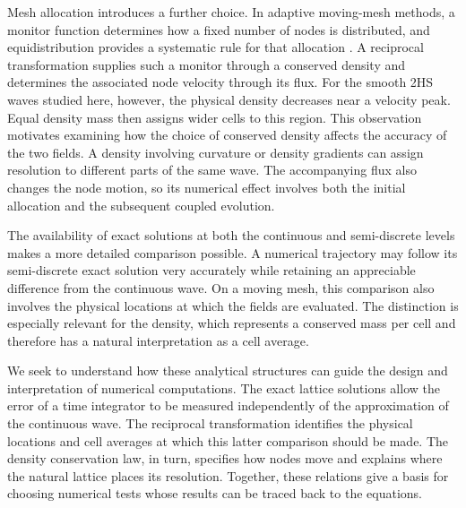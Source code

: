 \documentclass[11pt,a4paper]{article}
\begin{document}
Mesh allocation introduces a further choice. In adaptive moving-mesh methods, a monitor function determines how a fixed number of nodes is distributed, and equidistribution provides a systematic rule for that allocation \cite{huang2011}. A reciprocal transformation supplies such a monitor through a conserved density and determines the associated node velocity through its flux. For the smooth 2HS waves studied here, however, the physical density decreases near a velocity peak. Equal density mass then assigns wider cells to this region. This observation motivates examining how the choice of conserved density affects the accuracy of the two fields. A density involving curvature or density gradients can assign resolution to different parts of the same wave. The accompanying flux also changes the node motion, so its numerical effect involves both the initial allocation and the subsequent coupled evolution.

The availability of exact solutions at both the continuous and semi-discrete levels makes a more detailed comparison possible. A numerical trajectory may follow its semi-discrete exact solution very accurately while retaining an appreciable difference from the continuous wave. On a moving mesh, this comparison also involves the physical locations at which the fields are evaluated. The distinction is especially relevant for the density, which represents a conserved mass per cell and therefore has a natural interpretation as a cell average.

We seek to understand how these analytical structures can guide the design and interpretation of numerical computations. The exact lattice solutions allow the error of a time integrator to be measured independently of the approximation of the continuous wave. The reciprocal transformation identifies the physical locations and cell averages at which this latter comparison should be made. The density conservation law, in turn, specifies how nodes move and explains where the natural lattice places its resolution. Together, these relations give a basis for choosing numerical tests whose results can be traced back to the equations.
\end{document}
